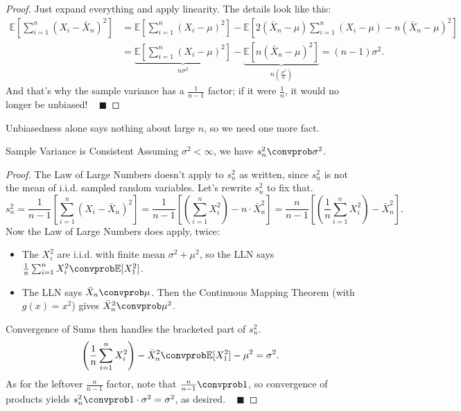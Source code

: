 \begin{proof}
    Just expand everything and apply linearity.  The details look like this:
    \begin{align*}
        \mathbb{E}\left[\sum_{i = 1}^n (X_i - \bar{X}_n)^2\right]
        & = \mathbb{E}\left[ \sum_{i = 1}^n (X_i - \mu)^2 \right]
        - \mathbb{E}\left[2(\bar{X}_n - \mu)\sum_{i = 1}^n (X_i - \mu)
        - n(\bar{X}_n - \mu)^2\right] \\
        & = \underbrace{\mathbb{E}\left[ \sum_{i = 1}^n (X_i - \mu)^2 \right]}_{n \sigma^2}
        - \underbrace{\mathbb{E}\left[n(\bar{X}_n - \mu)^2\right]}_{n\left(\frac{\sigma^2}{n}\right)}
        = (n - 1)\sigma^2.
    \end{align*}
    And that's why the sample variance has a $\frac{1}{n - 1}$ factor;
    if it were $\frac{1}{n}$, it would no longer be unbiased! ~ $\blacksquare$
\end{proof}

Unbiasedness alone says nothing about large $n$, so we need one more fact.

\begin{theorem}{Sample Variance is Consistent}
    Assuming $\sigma^2 < \infty$, we have $s_n^2 \convprob \sigma^2$.
\end{theorem}

\begin{proof}
    The Law of Large Numbers doesn't apply to $s_n^2$ as written,
    since $s_n^2$ is not the mean of i.i.d. sampled random variables.
    Let's rewrite $s_n^2$ to fix that.
    \[
        s_n^2
        = \frac{1}{n - 1} \left[ \sum_{i = 1}^n (X_i - \bar{X}_n)^2 \right]
        = \frac{1}{n - 1} \left[
            \left(\sum_{i = 1}^n X_i^2\right) - n \cdot \bar{X}_n^2
        \right]
        = \frac{n}{n - 1} \left[
            \left(\frac{1}{n}\sum_{i = 1}^n X_i^2\right) - \bar{X}_n^2
        \right].
    \]
    Now the Law of Large Numbers does apply, twice:
    \begin{itemize}
        \item The $X_i^2$ are i.i.d. with finite mean $\sigma^2 + \mu^2$,
        so the LLN says
        $\frac{1}{n}\sum_{i = 1}^n X_i^2 \convprob \mathbb{E}[X_1^2]$.
        \item The LLN says $\bar{X}_n \convprob \mu$.
        Then the Continuous Mapping Theorem (with $g(x) = x^2$)
        gives $\bar{X}_n^2 \convprob \mu^2$.
    \end{itemize}
    Convergence of Sums then handles the bracketed part of $s_n^2$.
    \[ \left(\frac{1}{n}\sum_{i = 1}^n X_i^2\right) - \bar{X}_n^2
    \convprob \mathbb{E}[X_1^2] - \mu^2 = \sigma^2. \]
    As for the leftover $\frac{n}{n - 1}$ factor,
    note that $\frac{n}{n - 1} \convprob 1$,
    so convergence of products yields
    $s_n^2 \convprob 1 \cdot \sigma^2 = \sigma^2$,
    as desired. ~ $\blacksquare$
\end{proof}

